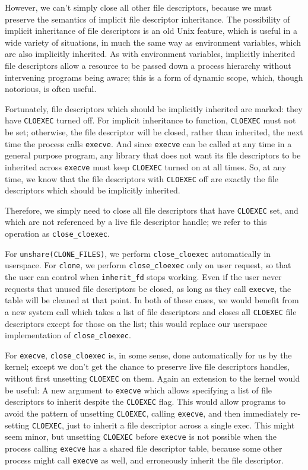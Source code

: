 \documentclass[letterpaper,twocolumn,10pt]{article}
\begin{document}
However, we can't simply close all other file descriptors,
because we must preserve the semantics of implicit file descriptor inheritance.
The possibility of implicit inheritance of file descriptors is an old Unix feature,
which is useful in a wide variety of situations,
in much the same way as environment variables, which are also implicitly inherited.
As with environment variables,
implicitly inherited file descriptors allow a resource to be passed down a process hierarchy
without intervening programs being aware;
this is a form of dynamic scope, which, though notorious, is often useful.

Fortunately, file descriptors which should be implicitly inherited are marked:
they have \texttt{CLOEXEC} turned off.
For implicit inheritance to function, \texttt{CLOEXEC} must not be set;
otherwise, the file descriptor will be closed, rather than inherited,
the next time the process calls \texttt{execve}.
And since \texttt{execve} can be called at any time in a general purpose program,
any library that does not want its file descriptors to be inherited across \texttt{execve}
must keep \texttt{CLOEXEC} turned on at all times.
So, at any time, we know that the file descriptors with \texttt{CLOEXEC} off
are exactly the file descriptors which should be implicitly inherited.

Therefore, we simply need to close all file descriptors that have \texttt{CLOEXEC} set,
and which are not referenced by a live file descriptor handle;
we refer to this operation as \verb|close_cloexec|.

For \verb|unshare(CLONE_FILES)|, we perform \verb|close_cloexec| automatically in userspace.
For \texttt{clone}, we perform \verb|close_cloexec| only on user request,
so that the user can control when \verb|inherit_fd| stops working.
Even if the user never requests that unused file descriptors be closed,
as long as they call \texttt{execve}, the table will be cleaned at that point.
In both of these cases,
we would benefit from a new system call which takes a list of file descriptors
and closes all \texttt{CLOEXEC} file descriptors except for those on the list;
this would replace our userspace implementation of \verb|close_cloexec|.

For \texttt{execve}, \verb|close_cloexec| is, in some sense, done automatically for us by the kernel;
except we don't get the chance to preserve live file descriptors handles,
without first unsetting \texttt{CLOEXEC} on them.
Again an extension to the kernel would be useful:
A new argument to \texttt{execve} which allows specifying a list of file descriptors to inherit
despite the \texttt{CLOEXEC} flag.
This would allow programs to avoid the pattern
of unsetting \texttt{CLOEXEC}, calling \texttt{execve}, and then immediately re-setting \texttt{CLOEXEC},
just to inherit a file descriptor across a single exec.
This might seem minor,
but unsetting \texttt{CLOEXEC} before \texttt{execve} is not possible
when the process calling \texttt{execve} has a shared file descriptor table,
because some other process might call \texttt{execve} as well,
and erroneously inherit the file descriptor.
\end{document}
